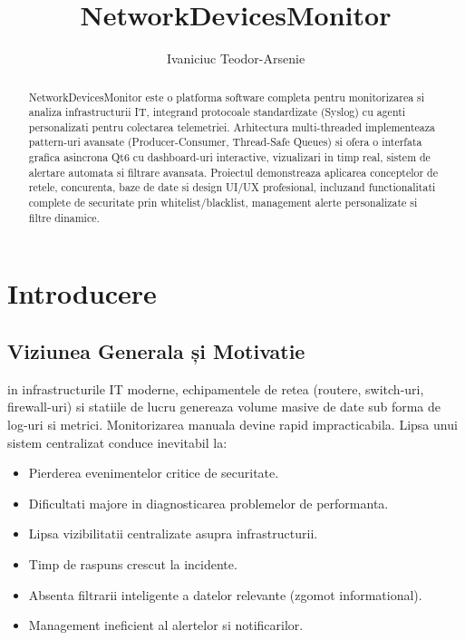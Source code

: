 \documentclass[runningheads]{llncs}
\begin{document}
\title{NetworkDevicesMonitor}

\author{Ivaniciuc Teodor-Arsenie}


\maketitle

\begin{abstract}
NetworkDevicesMonitor este o platforma software completa pentru monitorizarea si analiza infrastructurii IT, integrand protocoale standardizate (Syslog) cu agenti personalizati pentru colectarea telemetriei. Arhitectura multi-threaded implementeaza pattern-uri avansate (Producer-Consumer, Thread-Safe Queues) si ofera o interfata grafica asincrona Qt6 cu dashboard-uri interactive, vizualizari in timp real, sistem de alertare automata si filtrare avansata. Proiectul demonstreaza aplicarea conceptelor de retele, concurenta, baze de date si design UI/UX profesional, incluzand functionalitati complete de securitate prin whitelist/blacklist, management alerte personalizate si filtre dinamice.
\end{abstract}

\section{Introducere}

\subsection{Viziunea Generala și Motivatie}
in infrastructurile IT moderne, echipamentele de retea (routere, switch-uri, firewall-uri) si statiile de lucru genereaza volume masive de date sub forma de log-uri si metrici. Monitorizarea manuala devine rapid impracticabila. Lipsa unui sistem centralizat conduce inevitabil la:
\begin{itemize}[itemsep=0em]
    \item Pierderea evenimentelor critice de securitate.
    \item Dificultati majore in diagnosticarea problemelor de performanta.
    \item Lipsa vizibilitatii centralizate asupra infrastructurii.
    \item Timp de raspuns crescut la incidente.
    \item Absenta filtrarii inteligente a datelor relevante (zgomot informational).
    \item Management ineficient al alertelor si notificarilor.
\end{itemize}
\end{document}
